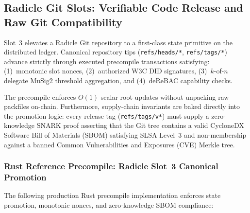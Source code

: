 \documentclass[a4paper,11pt,twoside,parskip=half-,headings=small]{scrartcl}
\newcommand{\code}[1]{\texttt{#1}}
\begin{document}
\subsection{Radicle Git Slots: Verifiable Code Release and Raw Git Compatibility}
\label{sec:radicle_slots}

Slot~3 elevates a Radicle Git repository to a first-class state primitive on the
distributed ledger. Canonical repository tips (\code{refs/heads/*}, \code{refs/tags/*})
advance strictly through executed precompile transactions satisfying:
(1)~monotonic slot nonces,
(2)~authorized W3C DID signatures,
(3)~$k$-of-$n$ delegate MuSig2 threshold aggregation, and
(4)~deReBAC capability checks.

The precompile enforces $O(1)$ scalar root updates without unpacking raw packfiles
on-chain. Furthermore, supply-chain invariants are baked directly into the promotion
logic: every release tag (\code{refs/tags/v*}) must supply a zero-knowledge SNARK proof
asserting that the Git tree contains a valid CycloneDX Software Bill of Materials (SBOM)
satisfying SLSA Level~3 and non-membership against a banned Common Vulnerabilities and
Exposures (CVE) Merkle tree.

\subsubsection{Rust Reference Precompile: Radicle Slot~3 Canonical Promotion}

The following production Rust precompile implementation enforces state promotion,
monotonic nonces, and zero-knowledge SBOM compliance:
\end{document}
